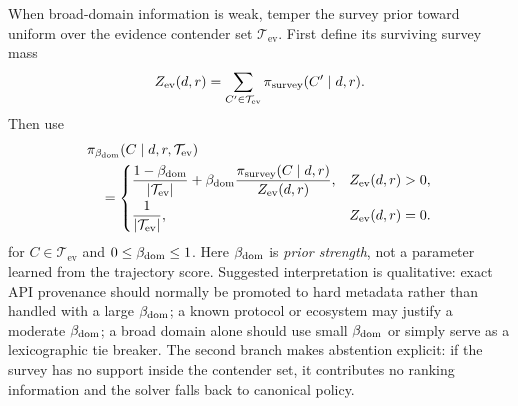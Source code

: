 \documentclass[11pt]{article}
\newcommand{\abs}[1]{\left\lvert #1 \right\rvert}
\begin{document}
    When broad-domain information is weak, temper the survey prior toward uniform over the
    evidence contender set $\mathcal T_{\mathrm{ev}}$. First define its surviving survey
    mass
    \begin{equation}
        Z_{\rm ev}(d,r)
        =\sum_{C'\in\mathcal T_{\mathrm{ev}}}\pi_{\mathrm{survey}}(C'\mid d,r).
    \end{equation}
    Then use
    \begin{equation}
        \begin{aligned}
            &\pi_{\beta_{\rm dom}}(C\mid d,r,\mathcal T_{\mathrm{ev}})\\
            &\quad=\begin{cases}
                       \dfrac{1-\beta_{\rm dom}}{\abs{\mathcal T_{\mathrm{ev}}}}
                       +\beta_{\rm dom}\dfrac{\pi_{\mathrm{survey}}(C\mid d,r)}{Z_{\rm ev}(d,r)},
                       & Z_{\rm ev}(d,r)>0,\\[8pt]
                       \dfrac{1}{\abs{\mathcal T_{\mathrm{ev}}}},
                       & Z_{\rm ev}(d,r)=0.
            \end{cases}
        \end{aligned}
        \label{eq:tempered-domain-prior}
    \end{equation}
    for $C\in\mathcal T_{\mathrm{ev}}$ and $0\le\beta_{\rm dom}\le1$.
    Here $\beta_{\rm dom}$ is \emph{prior strength}, not a parameter learned from the trajectory
    score. Suggested interpretation is qualitative: exact API provenance should normally
    be promoted to hard metadata rather than handled with a large $\beta_{\rm dom}$; a known
    protocol or ecosystem may justify a moderate $\beta_{\rm dom}$; a broad domain alone should use
    small $\beta_{\rm dom}$ or simply serve as a lexicographic tie breaker. The second branch
    makes abstention explicit: if the survey has no support inside the contender set, it
    contributes no ranking information and the solver falls back to canonical policy.
\end{document}
